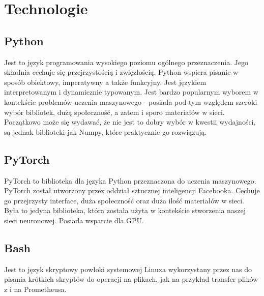 \section{Technologie}

\subsection{Python}
Jest to język programowania wysokiego poziomu ogólnego przeznaczenia.
Jego składnia cechuje się przejrzystością i zwięzłością. Python wspiera pisanie w sposób obiektowy, 
imperatywny a także funkcyjny. Jest językiem interpretowanym i dynamicznie typowanym. Jest bardzo popularnym 
wyborem w kontekście problemów uczenia maszynowego - posiada pod tym względem szeroki wybór bibliotek, 
dużą społeczność, a zatem i sporo materiałów w sieci.
Początkowo może się wydawać, że nie jest to dobry wybór w kwestii wydajności, 
są jednak biblioteki jak Numpy, które praktycznie go rozwiązują.

\subsection{PyTorch}
PyTorch \cite{pytorch} to biblioteka dla języka Python przeznaczona do uczenia maszynowego. PyTorch został utworzony
przez oddział sztucznej inteligencji Facebooka. Cechuje go przejrzysty interface, duża społeczność
oraz duża ilość materiałów w sieci. Była to jedyna biblioteka, która została użyta w kontekście 
stworzenia naszej sieci neuronowej. Posiada wsparcie dla GPU.

\subsection{Bash}
Jest to język skryptowy powłoki systemowej Linuxa wykorzystany przez nas do pisania krótkich skryptów
do operacji na plikach, jak na przykład transfer plików z i na Prometheusa.
